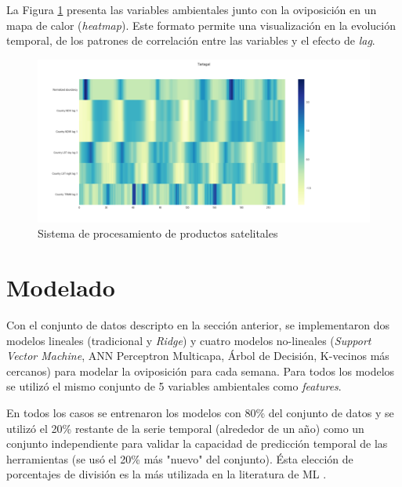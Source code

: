   \par La Figura \ref{fig:heatmap} presenta las variables ambientales junto
    con la oviposición en un mapa de calor (\textit{heatmap}). Este formato
    permite una visualización en la evolución temporal, de los
    patrones de correlación entre las variables y el efecto de \textit{lag}.

    \begin{figure}[hbt]
    \centering%
    \includegraphics[width=1\textwidth]{images/heatmap}%
    \caption{Sistema de procesamiento de productos satelitales}\label{fig:heatmap}
    \end{figure}



\section{Modelado}

  \par Con el conjunto de datos descripto en la sección anterior, se implementaron
    dos modelos lineales (tradicional y \textit{Ridge}) y cuatro modelos
    no-lineales (\textit{Support Vector Machine}, ANN Perceptron Multicapa,
    Árbol de Decisión, K-vecinos más cercanos) para modelar la oviposición
    para cada semana. Para todos los modelos se utilizó el mismo conjunto de
    5 variables ambientales como \textit{features}.

  \par En todos los casos se entrenaron los modelos con 80\% del conjunto de
    datos y se utilizó el 20\% restante de la serie temporal (alrededor de un año)
    como un conjunto independiente para validar la capacidad de predicción temporal
    de las herramientas (se usó el 20\% más "nuevo" del conjunto). Ésta elección
    de porcentajes de división es la más utilizada en la literatura de ML \cite{ml_rainfall}.

